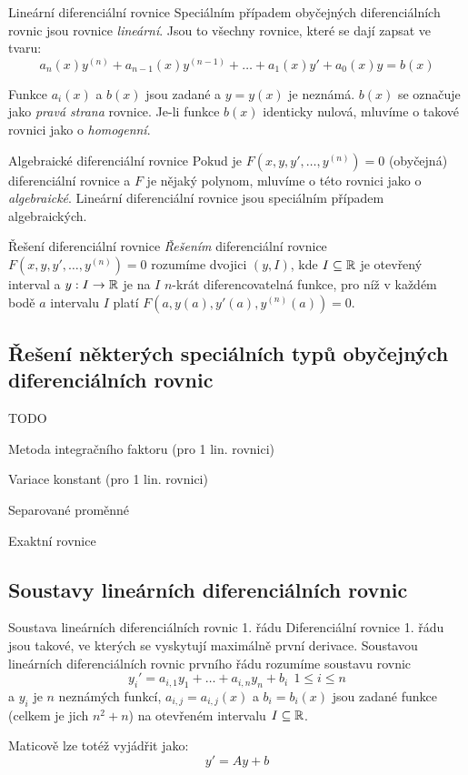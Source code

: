 \begin{definiceN}{Lineární diferenciální rovnice}
Speciálním případem obyčejných diferenciálních rovnic jsou rovnice \emph{lineární}. Jsou to všechny rovnice, které se dají zapsat ve tvaru:
$$a_n(x)y^{(n)}+a_{n-1}(x)y^{(n-1)}+\dots+a_1(x)y'+a_0(x)y=b(x)$$

\par\noindent Funkce $a_i(x)$ a $b(x)$ jsou zadané a $y=y(x)$ je neznámá. $b(x)$ se označuje jako \emph{pravá strana} rovnice. Je-li funkce $b(x)$ identicky nulová, mluvíme o takové rovnici jako o \emph{homogenní}.
\end{definiceN}

\begin{definiceN}{Algebraické diferenciální rovnice}
Pokud je $F(x,y,y',\dots,y^{(n)})=0$ (obyčejná) diferenciální rovnice a $F$ je nějaký polynom, mluvíme o této rovnici jako o \emph{algebraické}. Lineární diferenciální rovnice jsou speciálním případem algebraických.
\end{definiceN}

\begin{definiceN}{Řešení diferenciální rovnice}
\emph{Řešením} diferenciální rovnice $F(x,y,y',\dots,y^{(n)})=0$ rozumíme dvojici $(y,I)$, kde $I\subseteq\mathbb{R}$ je otevřený interval a $y:I\to\mathbb{R}$ je na $I$ $n$-krát diferencovatelná funkce, pro níž v každém bodě $a$ intervalu $I$ platí $F(a,y(a),y'(a),y^{(n)}(a))=0$.
\end{definiceN}

\subsection{Řešení některých speciálních typů obyčejných diferenciálních rovnic}

TODO
\begin{pitemize}
\item Metoda integračního faktoru (pro 1 lin. rovnici)
\item Variace konstant (pro 1 lin. rovnici)
\item Separované proměnné
\item Exaktní rovnice
\end{pitemize}

\subsection{Soustavy lineárních diferenciálních rovnic}

\begin{definiceN}{Soustava lineárních diferenciálních rovnic 1. řádu}
Diferenciální rovnice 1. řádu jsou takové, ve kterých se vyskytují maximálně první derivace. Soustavou lineárních diferenciálních rovnic prvního řádu rozumíme soustavu rovnic
$$y_i'=a_{i,1}y_1+\dots+a_{i,n}y_n+b_i\ \ 1\leq i\leq n$$
a $y_i$ je $n$ neznámých funkcí, $a_{i,j}=a_{i,j}(x)$ a $b_i=b_i(x)$ jsou zadané funkce (celkem je jich $n^2+n$) na otevřeném intervalu $I\subseteq\mathbb{R}$.

\noindent Maticově lze totéž vyjádřit jako:
$$y'=Ay+b$$
\end{definiceN}

